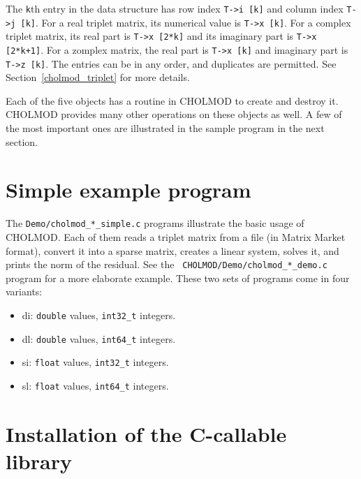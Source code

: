 \documentclass[11pt]{article}
\begin{document}
\begin{enumerate}
    The {\tt k}th entry in the data structure has row index {\tt T->i [k]} and
    column index {\tt T->j [k]}.  For a real triplet matrix, its numerical
    value is {\tt T->x [k]}.  For a complex triplet matrix, its real part is
    {\tt T->x [2*k]} and its imaginary part is {\tt T->x [2*k+1]}.  For a
    zomplex matrix, the real part is {\tt T->x [k]} and imaginary part is {\tt
    T->z [k]}.  The entries can be in any order, and duplicates are permitted.
    See Section~\ref{cholmod_triplet} for more details.

\end{enumerate}

Each of the five objects has a routine in CHOLMOD to create and destroy it.
CHOLMOD provides many other operations on these objects as well.  A few of the
most important ones are illustrated in the sample program in the next section.

\newpage \section{Simple example program}


The {\tt Demo/cholmod\_*\_simple.c} programs illustrate the basic usage of
CHOLMOD.  Each of them reads a triplet matrix from a file (in Matrix Market
format), convert it into a sparse matrix, creates a linear system, solves it,
and prints the norm of the residual.  See the {\tt
CHOLMOD/Demo/cholmod\_*\_demo.c} program for a more elaborate example.  These
two sets of programs come in four variants:

    \begin{itemize}
    \item di: {\tt double} values, {\tt int32\_t} integers.
    \item dl: {\tt double} values, {\tt int64\_t} integers.
    \item si: {\tt float} values, {\tt int32\_t} integers.
    \item sl: {\tt float} values, {\tt int64\_t} integers.
    \end{itemize}

\newpage \section{Installation of the C-callable library}
\label{Install}
\end{document}
